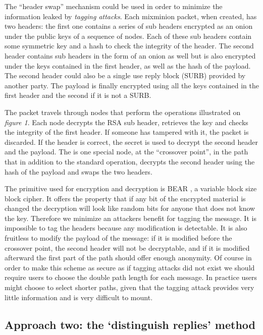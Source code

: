 \documentclass{llncs}
\begin{document}
The ``header swap'' mechanism could be used in order to minimize the information leaked by \emph{tagging attacks}. Each mixminion packet, when created, has two headers: the first one contains a series of sub headers encrypted as an onion under the public keys of a sequence of nodes. Each of these sub headers contain some symmetric key and a hash to check the integrity of the header. The second header contains sub headers in the form of an onion as well but is also encrypted under the keys contained in the first header, as well as the hash of the payload. The second header could also be a single use reply block (SURB) provided by another party. The payload is finally encrypted using all the keys contained in the first header and the second if it is not a SURB.

The packet travels through nodes that perform the operations illustrated on \emph{figure 1}. Each node decrypts the RSA sub header, retrieves the key and checks the integrity of the first header. If someone has tampered with it, the packet is discarded. If the header is correct, the secret is used to decrypt the second header and the payload. The is one special node, at the ``crossover point'', in the path that in addition to the standard operation, decrypts the second header using the hash of the payload and swaps the two headers.

The primitive used for encryption and decryption is BEAR \cite{BEAR}, a variable block size block cipher. It offers the property that if any bit of the encrypted material is changed the decryption will look like random bits for anyone that does not know the key. Therefore we minimize an attackers benefit for tagging the message. It is impossible to tag the headers because any modification is detectable. It is also fruitless to modify the payload of the message: if it is modified before the crossover point, the second header will not be decryptable, and if it is modified afterward the first part of the path should offer enough anonymity. Of course in order to make this scheme as secure as if tagging attacks did not exist we should require users to choose the double path length for each message. In practice users might choose to select shorter paths, given that the tagging attack provides very little information and is very difficult to mount.

\subsection{Approach two: the `distinguish replies' method}
\end{document}
